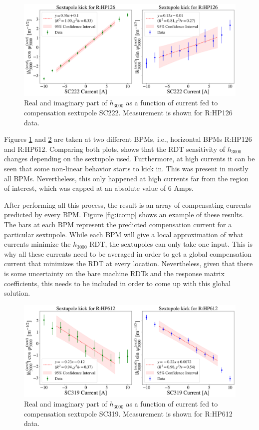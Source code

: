 \begin{figure}[H]
    \centering
    \includegraphics[width=\columnwidth]{chapter4/h3000_sc222.png}
    \caption{Real and imaginary part of $h_{3000}$ as a function of current fed to compensation sextupole SC222. Measurement is shown for R:HP126 data.}
    \label{fig:h3000_sc222}
\end{figure}

Figures \ref{fig:h3000_sc222} and \ref{fig:h3000_sc319} are taken at two different BPMs, i.e., horizontal BPMs R:HP126 and R:HP612. Comparing both plots, shows that the RDT sensitivity of $h_{3000}$ changes depending on the sextupole used. Furthermore, at high currents it can be seen that some non-linear behavior starts to kick in. This was present in mostly all BPMs. Nevertheless, this only happened at high currents far from the region of interest, which was capped at an absolute value of 6 Amps. 

After performing all this process, the result is an array of compensating currents predicted by every BPM. Figure \ref{fig:icomp} shows an example of these results. The bars at each BPM represent the predicted compensation current for a particular sextupole. While each BPM will give a local approximation of what currents minimize the $h_{3000}$ RDT, the sextupoles can only take one input. This is why all these currents need to be averaged in order to get a global compensation current that minimizes the RDT at every location. Nevertheless, given that there is some uncertainty on the bare machine RDTs and the response matrix coefficients, this needs to be included in order to come up with this global solution. 

\begin{figure}[H]
    \centering
    \includegraphics[width=\columnwidth]{chapter4/h3000_sc319.png}
    \caption{Real and imaginary part of $h_{3000}$ as a function of current fed to compensation sextupole SC319. Measurement is shown for R:HP612 data.}
    \label{fig:h3000_sc319}
\end{figure}

